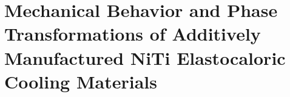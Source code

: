 \chapter{Mechanical Behavior and Phase Transformations of Additively Manufactured NiTi Elastocaloric Cooling Materials}
